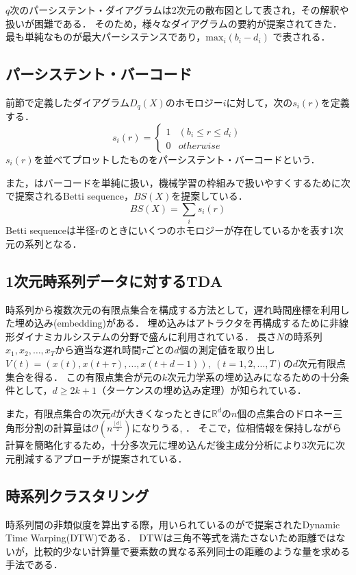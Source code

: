 \documentclass{jarticle}
\begin{document}
$q$次のパーシステント・ダイアグラムは2次元の散布図として表され，その解釈や扱いが困難である．
そのため，様々なダイアグラムの要約が提案されてきた．
最も単純なものが最大パーシステンスであり，$\text{max}_i(b_i - d_i)$
で表される．

\subsection{パーシステント・バーコード}
前節で定義したダイアグラム$D_q(X)$のホモロジー$i$に対して，次の$s_i(r)$を定義する．
$$
s_i(r) = 
\begin{cases}
1 & (b_i \leq r \leq d_i)\\
0 & otherwise
\end{cases}
$$
$s_i(r)$を並べてプロットしたものをパーシステント・バーコードという．

また，\cite{Umeda2017}はバーコードを単純に扱い，機械学習の枠組みで扱いやすくするために次で提案されるBetti sequence，$BS(X)$を提案している．
$$
BS(X) = \sum_i s_i(r)
$$
Betti sequenceは半径$r$のときにいくつのホモロジーが存在しているかを表す1次元の系列となる．

\subsection{1次元時系列データに対するTDA}
時系列から複数次元の有限点集合を構成する方法として，遅れ時間座標を利用した埋め込み(embedding)がある．
埋め込みはアトラクタを再構成するために非線形ダイナミカルシステムの分野で盛んに利用されている．
長さ$N$の時系列$x_1, x_2, \dots , x_T$から適当な遅れ時間$\tau$ごとの$d$個の測定値を取り出し$V(t) = (x(t), x(t+\tau), \dots, x(t + d - 1)),\ (t = 1,2,\dots, T)$の$d$次元有限点集合を得る．
この有限点集合が元の$k$次元力学系の埋め込みになるための十分条件として，$d\geq 2k+1$（ターケンスの埋め込み定理）が知られている．

また，有限点集合の次元$d$が大きくなったときに$\mathbb R^d$の$n$個の点集合のドロネー三角形分割の計算量は$\mathcal O(n^{\frac{[d]}{2}})$になりうる\cite{Amenta2007}, \cite{Attali2003}．
そこで，位相情報を保持しながら計算を簡略化するため，十分多次元に埋め込んだ後主成分分析により3次元に次元削減するアプローチが提案されている\cite{Truong2017}．


\subsection{時系列クラスタリング}
時系列間の非類似度を算出する際，用いられているのが\cite{Berndt1996}で提案されたDynamic Time Warping(DTW)である．
DTWは三角不等式を満たさないため距離ではないが，比較的少ない計算量で要素数の異なる系列同士の距離のような量を求める手法である．
\end{document}

